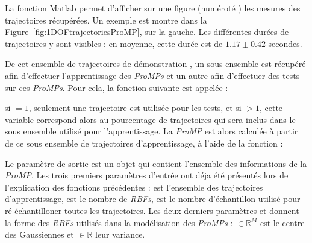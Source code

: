 \documentclass[utf8]{frontiersSCNS} %
\newcommand{\rev}[1]{\textcolor{blue}{#1}}
\begin{document}

La fonction Matlab  permet d'afficher sur une figure (numéroté ) les mesures des trajectoires récupérées. %
Un exemple est montre dans la Figure~\ref{fig:1DOFtrajectoriesProMP}, sur la gauche. Les différentes durées de trajectoires y sont visibles : en moyenne, cette durée est de $1.17 \pm 0.42$ secondes.


De cet ensemble de trajectoires de démonstration , un sous ensemble est récupéré afin d'effectuer l'apprentissage des \textit{ProMPs} et un autre afin d'effectuer des tests sur ces \textit{ProMPs}. Pour cela, la fonction suivante est appelée :

si $=1$, seulement une trajectoire est utilisée pour les tests, et si $ >1$, cette variable correspond alors au pourcentage de trajectoires qui sera inclus dans le sous ensemble utilisé pour l'apprentissage.
La \textit{ProMP} est alors calculée à partir de ce sous ensemble de trajectoires d'apprentissage, à l'aide de la fonction :


Le paramètre de sortie   est un objet qui contient l'ensemble des informations de la \textit{ProMP}. 
Les trois premiers paramètres d'entrée ont déja été présentés lors de l'explication des fonctions précédentes :  est l'ensemble des trajectoires d'apprentissage,  est le nombre de \textit{RBFs},  est le nombre d'échantillon utilisé pour ré-échantilloner toutes les trajectoires.
Les deux derniers paramètres  et  donnent la forme des \textit{RBFs} utilisés dans la modélisation des \textit{ProMPs} :  $\in \mathbb{R}^M$ est le centre des Gaussiennes et  $\in \mathbb{R}$ leur variance. 
\end{document}
